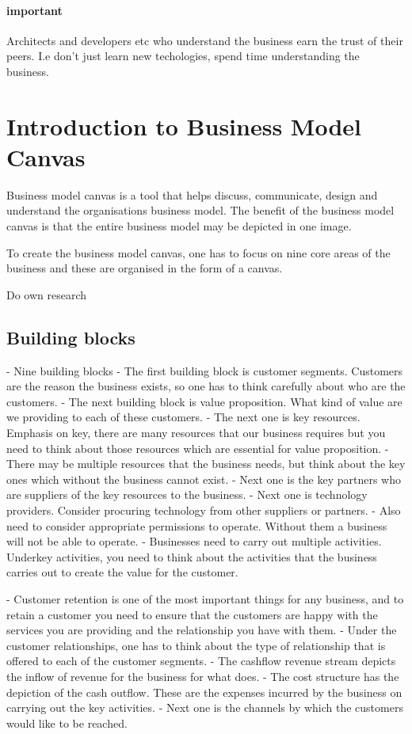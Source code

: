 \documentclass[a4paper, 11pt]{book}
\begin{document}
    \paragraph{important}
    Architects and developers etc who understand the business earn the trust of their peers.
    I.e don't just learn new techologies, spend time understanding the business.


    \section{Introduction to Business Model Canvas}
    Business model canvas is a tool that helps discuss, communicate, design and understand the organisations business model.
    The benefit of the business model canvas is that the entire business model may be depicted in one image.

    To create the business model canvas, one has to focus on nine core areas of the business and these are organised in the form of a canvas.

    Do own research

    \subsection{Building blocks}
    - Nine building blocks
    - The first building block is customer segments. Customers are the reason the business exists, so one has to think carefully about who are the customers.
    - The next building block is value proposition. What kind of value are we providing to each of these customers.
    - The next one is key resources. Emphasis on key, there are many resources that our business requires but you need to think about those resources which are essential for value proposition.
    - There may be multiple resources that the business needs, but think about the key ones which without the business cannot exist.
    - Next one is the key partners who are suppliers of the key resources to the business.
    - Next one is technology providers. Consider procuring technology from other suppliers or partners.
    - Also need to consider appropriate permissions to operate. Without them a business will not be able to operate.
    - Businesses need to carry out multiple activities. Underkey activities, you need to think about the activities that the business carries out to create the value for the customer.

    - Customer retention is one of the most important things for any business, and to retain a customer you need to ensure that the customers are happy with the services you are providing and the relationship you have with them.
    - Under the customer relationships, one has to think about the type of relationship that is offered to each of the customer segments.
    - The cashflow revenue stream depicts the inflow of revenue for the business for what does.
    - The cost structure has the depiction of the cash outflow. These are the expenses incurred by the business on carrying out the key activities.
    - Next one is the channels by which the customers would like to be reached.
\end{document}
